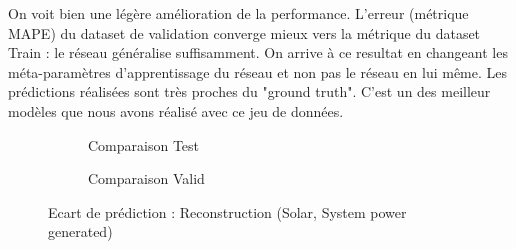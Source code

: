 \documentclass{article}
\begin{document}
    On voit bien une légère amélioration de la performance. L'erreur (métrique MAPE) du dataset de validation converge mieux vers la métrique du dataset Train : le réseau généralise suffisamment. On arrive à ce resultat en changeant les méta-paramètres d'apprentissage du réseau et non pas le réseau en lui même. Les prédictions réalisées sont très proches du "ground truth". C'est un des meilleur modèles que nous avons réalisé avec ce jeu de données.
    
    \begin{figure}[H]
        \centering
        \begin{subfigure}[t]{0.49\textwidth}
            \caption{Comparaison Test}
        \end{subfigure}
        \hfill
        \begin{subfigure}[t]{0.49\textwidth}
        \caption{Comparaison Valid}
    \end{subfigure}
        \caption{Ecart de prédiction : Reconstruction (Solar, System power generated)}
        \label{fig:test}
    \end{figure}
    
\end{document}
